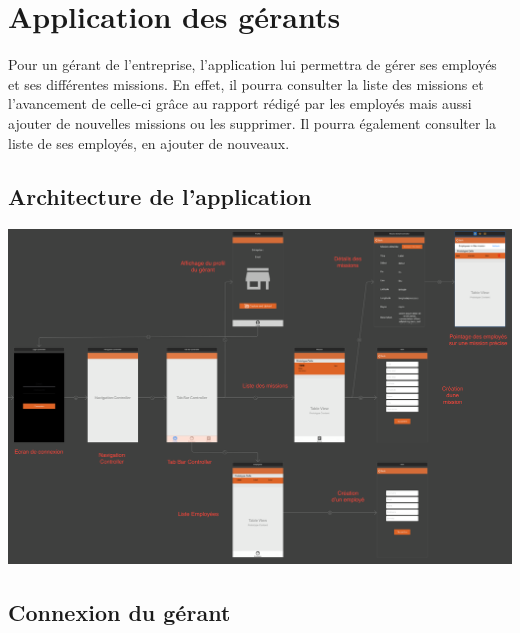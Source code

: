 \documentclass{article}
\begin{document}
\section{Application des gérants}

Pour un gérant de l'entreprise, l'application lui permettra de gérer ses employés et ses différentes missions. En effet, il pourra consulter la liste des missions et l'avancement de celle-ci grâce au rapport rédigé par les employés mais aussi ajouter de nouvelles missions ou les supprimer. Il pourra également consulter la liste de ses employés, en ajouter de nouveaux.

\subsection{Architecture de l'application}

\begin{center}
    \includegraphics[scale=0.2]{archiGerant.png}
\end{center}

\newpage

\subsection{Connexion du gérant}
\end{document}
